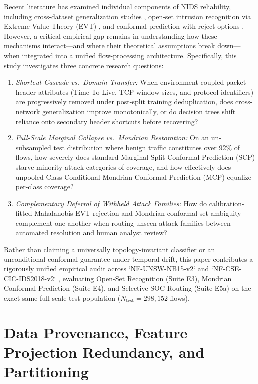 ﻿\documentclass[conference]{IEEEtran}
\begin{document}
Recent literature has examined individual components of NIDS reliability, including cross-dataset generalization studies \cite{b6,b7}, open-set intrusion recognition via Extreme Value Theory (EVT) \cite{b9,b10}, and conformal prediction with reject options \cite{b11,b12,b13}. However, a critical empirical gap remains in understanding how these mechanisms interact—and where their theoretical assumptions break down—when integrated into a unified flow-processing architecture. Specifically, this study investigates three concrete research questions:
\begin{enumerate}
    \item \textit{Shortcut Cascade vs.\ Domain Transfer:} When environment-coupled packet header attributes (Time-To-Live, TCP window sizes, and protocol identifiers) are progressively removed under post-split training deduplication, does cross-network generalization improve monotonically, or do decision trees shift reliance onto secondary header shortcuts before recovering?
    \item \textit{Full-Scale Marginal Collapse vs.\ Mondrian Restoration:} On an un-subsampled test distribution where benign traffic constitutes over 92\% of flows, how severely does standard Marginal Split Conformal Prediction (SCP) starve minority attack categories of coverage, and how effectively does unpooled Class-Conditional Mondrian Conformal Prediction (MCP) equalize per-class coverage?
    \item \textit{Complementary Deferral of Withheld Attack Families:} How do calibration-fitted Mahalanobis EVT rejection and Mondrian conformal set ambiguity complement one another when routing unseen attack families between automated resolution and human analyst review?
\end{enumerate}

Rather than claiming a universally topology-invariant classifier or an unconditional conformal guarantee under temporal drift, this paper contributes a rigorously unified empirical audit across `NF-UNSW-NB15-v2` and `NF-CSE-CIC-IDS2018-v2` \cite{b2}, evaluating Open-Set Recognition (Suite E3), Mondrian Conformal Prediction (Suite E4), and Selective SOC Routing (Suite E5a) on the exact same full-scale test population ($N_{\text{test}} = 298,152$ flows).

\section{Data Provenance, Feature Projection Redundancy, and Partitioning}
\end{document}
